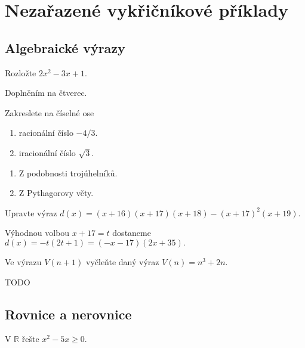 \section{Nezařazené vykřičníkové příklady}
\subsection{Algebraické výrazy}
\begin{priklad}
    Rozložte $2x^2 - 3x+1.$
\end{priklad}

\begin{reseni}
Doplněním na čtverec.
\end{reseni}

\begin{priklad}
    Zakreslete na číselné ose
    \begin{enumerate}[$a.$]
    \item racionální číslo $-4/3.$
   	\item iracionální číslo $\sqrt{3}. $
    \end{enumerate}
\end{priklad}

\begin{reseni}
\begin{enumerate}[$a.$]
\item Z podobnosti trojúhelníků.
\item Z Pythagorovy věty.
\end{enumerate}
\end{reseni}

\begin{priklad}
    Upravte výraz $d(x)=(x+16)(x+17)(x+18)-(x+17)^2(x+19).$
\end{priklad}

\begin{reseni}
 Výhodnou volbou $x+17=t$ dostaneme $d(x)=-t(2t+1)=(-x-17)(2x+35).$
\end{reseni}

\begin{priklad}
    Ve výrazu $V(n+1)$ vyčleňte daný výraz $V(n)=n^3+2n.$
\end{priklad}

\begin{reseni}
 TODO
\end{reseni}

\subsection{Rovnice a nerovnice}
\begin{priklad}
    V $\mathbb R$ řešte $x^2-5x \geq 0.$
\end{priklad}

